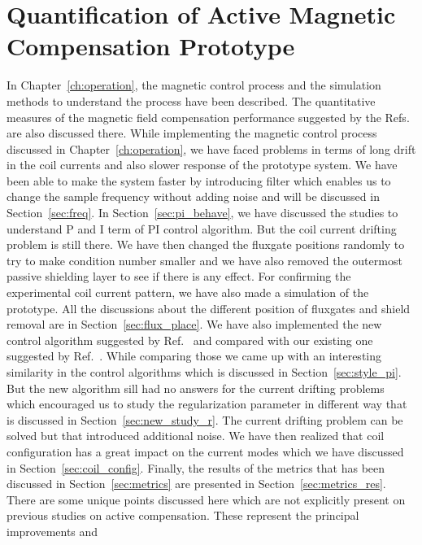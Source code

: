 


\chapter{Quantification of Active Magnetic Compensation Prototype}\label{ch:quantification}


In Chapter~\ref{ch:operation}, the magnetic control process and the
simulation methods to understand the process have been described. The
quantitative measures of the magnetic field compensation performance
suggested by the Refs.\cite{bea,lins,rawlik} are also discussed
there. While implementing the magnetic control process discussed in
Chapter~\ref{ch:operation}, we have faced problems in terms of long
drift in the coil currents and also slower response of the prototype
system. We have been able to make the system faster by introducing
filter which enables us to change the sample frequency without adding
noise and will be discussed in Section~\ref{sec:freq}. In
Section~\ref{sec:pi_behave}, we have discussed the studies to
understand P and I term of PI control algorithm. But the coil current
drifting problem is still there. We have then changed the fluxgate
positions randomly to try to make condition number smaller and we have
also removed the outermost passive shielding layer to see if there is
any effect. For confirming the experimental coil current pattern, we
have also made a simulation of the prototype. All the discussions
about the different position of fluxgates and shield removal are in
Section~\ref{sec:flux_place}. We have also implemented the new control
algorithm suggested by Ref.~\cite{rawlik} and compared with our
existing one suggested by Ref.~\cite{bea}. While comparing those we
came up with an interesting similarity in the control algorithms which
is discussed in Section~\ref{sec:style_pi}. But the new algorithm sill
had no answers for the current drifting problems which encouraged us
to study the regularization parameter in different way that is
discussed in Section~\ref{sec:new_study_r}. The current drifting
problem can be solved but that introduced additional noise. We have
then realized that coil configuration has a great impact on the
current modes which we have discussed in
Section~\ref{sec:coil_config}. Finally, the results of the metrics
that has been discussed in Section~\ref{sec:metrics} are presented in
Section~\ref{sec:metrics_res}. There are some unique points discussed
here which are not explicitly present on previous studies on active
compensation. These represent the principal improvements and
